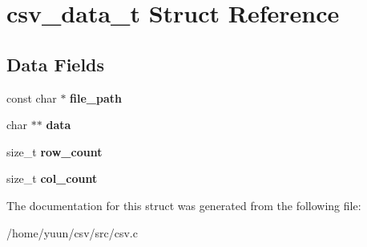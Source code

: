 \hypertarget{structcsv__data__t}{}\section{csv\+\_\+data\+\_\+t Struct Reference}
\label{structcsv__data__t}
\subsection*{Data Fields}
\begin{DoxyCompactItemize}
\item 
\mbox{\label{structcsv__data__t_a1c9143d8a093d86ff6c083a6b6adcdb9}} 
const char $\ast$ {\bfseries file\+\_\+path}
\item 
\mbox{\label{structcsv__data__t_a6b121cb8ec17d1734645f705377f63df}} 
char $\ast$$\ast$ {\bfseries data}
\item 
\mbox{\label{structcsv__data__t_a7d587ac4cc97a4dcf413223ab3031977}} 
size\+\_\+t {\bfseries row\+\_\+count}
\item 
\mbox{\label{structcsv__data__t_a57ba602c9ba129703a25636eb3ea51e0}} 
size\+\_\+t {\bfseries col\+\_\+count}
\end{DoxyCompactItemize}


The documentation for this struct was generated from the following file\+:\begin{DoxyCompactItemize}
\item 
/home/yuun/csv/src/csv.\+c\end{DoxyCompactItemize}
